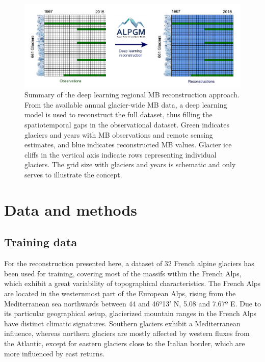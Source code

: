 \begin{figure}[t]
\centering
\includegraphics[width=15cm]{Figures/past/Figure_1.pdf}
\captionsetup{justification=centering}
\caption{Summary of the deep learning regional MB reconstruction approach. From the available annual glacier-wide MB data, a deep learning model is used to reconstruct the full dataset, thus filling the spatiotemporal gaps in the observational dataset. Green indicates glaciers and years with MB observations and remote sensing estimates, and blue indicates reconstructed MB values. Glacier ice cliffs in the vertical axis indicate rows representing individual glaciers. The grid size with glaciers and years is schematic and only serves to illustrate the concept.}
\label{past:fig1}
\end{figure}


\section{Data and methods} \label{past:methods}

\subsection{Training data} \label{past:methods:data}

For the reconstruction presented here, a dataset of 32 French alpine glaciers has been used for training, covering most of the massifs within the French Alps, which exhibit a great variability of topographical characteristics. The French Alps are located in the westernmost part of the European Alps, rising from the Mediterranean sea northwards between 44 and 46º13' N, 5.08 and 7.67º E. Due to its particular geographical setup, glacierized mountain ranges in the French Alps have distinct climatic signatures. Southern glaciers exhibit a Mediterranean influence, whereas northern glaciers are mostly affected by western fluxes from the Atlantic, except for eastern glaciers close to the Italian border, which are more influenced by east returns. 

